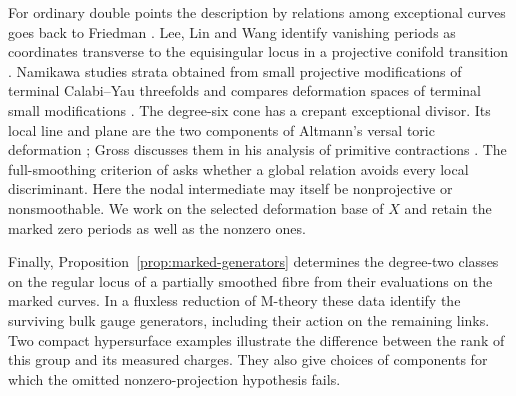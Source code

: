 \documentclass[11pt]{amsart}
\theoremstyle{definition}\newtheorem{example}[theorem]{Example}
\theoremstyle{remark}\newtheorem{remark}[theorem]{Remark}
\begin{document}
For ordinary double points the description by relations among exceptional
curves goes back to Friedman \cite{Fried}. Lee, Lin and Wang identify
vanishing periods as coordinates transverse to the equisingular locus in
a projective conifold transition \cite[Lemma~3.13 and Proposition~3.16]{LLW}.
Namikawa studies strata obtained from small projective modifications of
terminal Calabi--Yau threefolds and compares deformation spaces of
terminal small modifications \cite[Proposition~2.3 and Theorems~2.5,~2.7]{Nam}.
The degree-six cone has a crepant exceptional divisor. Its local line
and plane are the two components of Altmann's versal toric deformation
\cite{Alt}; Gross discusses them in his analysis of primitive
contractions \cite[\S5]{Gross}. The full-smoothing criterion of
\cite[Theorem~4.7]{W5} asks whether a global relation avoids every
local discriminant. Here the nodal intermediate may itself be
nonprojective or nonsmoothable. We work on the selected deformation
base of $X$ and retain the marked zero periods as well as the nonzero
ones.

Finally, Proposition~\ref{prop:marked-generators} determines the
degree-two classes on the regular locus of a partially smoothed fibre
from their evaluations on the marked curves. In a fluxless reduction
of M-theory these data identify the surviving bulk gauge generators,
including their action on the remaining links. Two compact hypersurface
examples illustrate the difference between the rank of this group and
its measured charges. They also give choices of components for which
the omitted nonzero-projection hypothesis fails.
\end{document}
